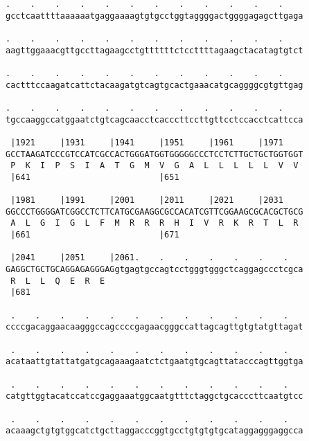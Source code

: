 \documentclass{article}
\begin{document}
\begin{Verbatim}
.    .    .    .    .    .    .    .    .    .    .    .    
gcctcaattttaaaaaatgaggaaaagtgtgcctggtaggggactggggagagcttgaga
                                                            
.    .    .    .    .    .    .    .    .    .    .    .    
aagttggaaacgttgccttagaagcctgttttttctccttttagaagctacatagtgtct
                                                            
.    .    .    .    .    .    .    .    .    .    .    .    
cactttccaagatcattctacaagatgtcagtgcactgaaacatgcaggggcgtgttgag
                                                            
.    .    .    .    .    .    .    .    .    .    .    .    
tgccaaggccatggaatctgtcagcaacctcacccttccttgttcctccacctcattcca
                                                            
 |1921     |1931     |1941     |1951     |1961     |1971    
GCCTAAGATCCCGTCCATCGCCACTGGGATGGTGGGGGCCCTCCTCTTGCTGCTGGTGGT
 P  K  I  P  S  I  A  T  G  M  V  G  A  L  L  L  L  L  V  V 
 |641                          |651                         
  
 |1981     |1991     |2001     |2011     |2021     |2031    
GGCCCTGGGGATCGGCCTCTTCATGCGAAGGCGCCACATCGTTCGGAAGCGCACGCTGCG
 A  L  G  I  G  L  F  M  R  R  R  H  I  V  R  K  R  T  L  R 
 |661                          |671                         
  
 |2041     |2051     |2061.    .    .    .    .    .    .   
GAGGCTGCTGCAGGAGAGGGAGgtgagtgccagtcctgggtgggctcaggagccctcgca
 R  L  L  Q  E  R  E                                        
 |681                                                       
  
 .    .    .    .    .    .    .    .    .    .    .    .   
ccccgacaggaacaagggccagccccgagaacgggccattagcagttgtgtatgttagat
                                                            
 .    .    .    .    .    .    .    .    .    .    .    .   
acataattgtattatgatgcagaaagaatctctgaatgtgcagttatacccagttggtga
                                                            
 .    .    .    .    .    .    .    .    .    .    .    .   
catgttggtacatccatccgaggaaatggcaatgtttctaggctgcacccttcaatgtcc
                                                            
 .    .    .    .    .    .    .    .    .    .    .    .   
acaaagctgtgtggcatctgcttaggacccggtgcctgtgtgtgcataggagggaggcca
                                                            

\end{Verbatim}
\end{document}
